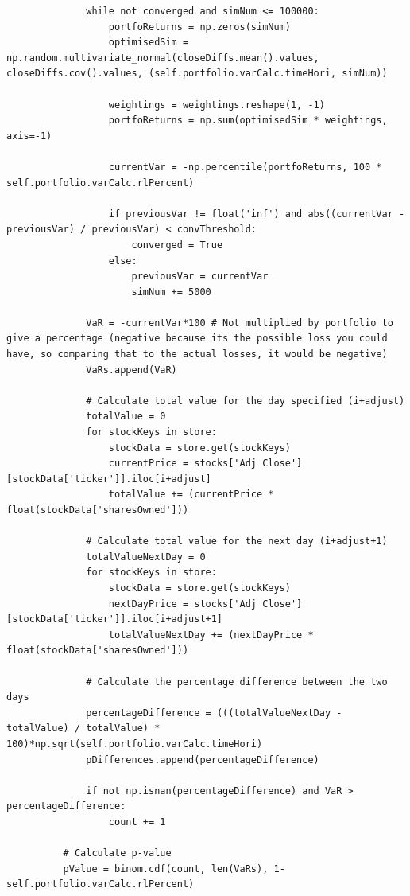 \documentclass{article}
\begin{document}
\begin{verbatim}
              while not converged and simNum <= 100000:            
                  portfoReturns = np.zeros(simNum)
                  optimisedSim = np.random.multivariate_normal(closeDiffs.mean().values, closeDiffs.cov().values, (self.portfolio.varCalc.timeHori, simNum))
      
                  weightings = weightings.reshape(1, -1)
                  portfoReturns = np.sum(optimisedSim * weightings, axis=-1)
      
                  currentVar = -np.percentile(portfoReturns, 100 * self.portfolio.varCalc.rlPercent)
      
                  if previousVar != float('inf') and abs((currentVar - previousVar) / previousVar) < convThreshold:
                      converged = True
                  else:
                      previousVar = currentVar
                      simNum += 5000
      
              VaR = -currentVar*100 # Not multiplied by portfolio to give a percentage (negative because its the possible loss you could have, so comparing that to the actual losses, it would be negative)
              VaRs.append(VaR)

              # Calculate total value for the day specified (i+adjust)
              totalValue = 0
              for stockKeys in store:
                  stockData = store.get(stockKeys)
                  currentPrice = stocks['Adj Close'][stockData['ticker']].iloc[i+adjust]
                  totalValue += (currentPrice * float(stockData['sharesOwned']))
              
              # Calculate total value for the next day (i+adjust+1)
              totalValueNextDay = 0
              for stockKeys in store:
                  stockData = store.get(stockKeys)
                  nextDayPrice = stocks['Adj Close'][stockData['ticker']].iloc[i+adjust+1]
                  totalValueNextDay += (nextDayPrice * float(stockData['sharesOwned']))
              
              # Calculate the percentage difference between the two days
              percentageDifference = (((totalValueNextDay - totalValue) / totalValue) * 100)*np.sqrt(self.portfolio.varCalc.timeHori)
              pDifferences.append(percentageDifference)
      
              if not np.isnan(percentageDifference) and VaR > percentageDifference:
                  count += 1
              
          # Calculate p-value
          pValue = binom.cdf(count, len(VaRs), 1-self.portfolio.varCalc.rlPercent)
          

\end{verbatim}
\end{document}
